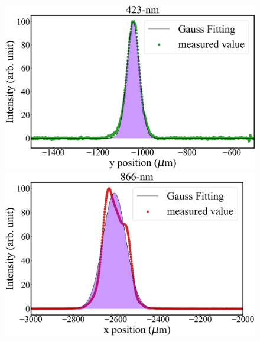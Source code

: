 \begin{figure}[h]
\begin{center}
\begin{minipage}{0.48\linewidth}
\begin{center}
	\end{center}
	\end{minipage}
	\begin{minipage}{0.48\linewidth}
	\begin{center}
		\includegraphics[width=0.98\columnwidth]{./experimental_setup/figure/423GaussianFittingYpos.jpg}
	\end{center}
	\end{minipage}
	\begin{minipage}{0.48\linewidth}
	\begin{center}
		\includegraphics[width = 0.98\columnwidth]{./experimental_setup/figure/866GaussianFittingXpos.jpg}
	\end{center}
	\end{minipage}
	\begin{minipage}{0.48\linewidth}
	\begin{center}

\end{center}
\end{minipage}
\end{center}
\end{figure}
